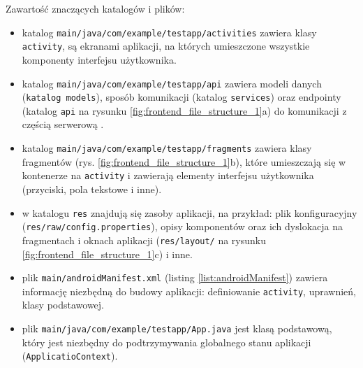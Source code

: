 Zawartość znaczących katalogów i plików:
\begin{itemize}
    \item katalog \texttt{main/java/com/example/testapp/activities} zawiera klasy \texttt{activity}, są ekranami aplikacji, na których umieszczone wszystkie komponenty interfejsu użytkownika.
    \item katalog \texttt{main/java/com/example/testapp/api} zawiera modeli danych (\texttt{katalog models}), sposób komunikacji (katalog \texttt{services}) oraz endpointy (katalog \texttt{api} na rysunku \ref{fig:frontend_file_structure_1}a) do komunikacji z częścią serwerową .
    \item katalog \texttt{main/java/com/example/testapp/fragments} zawiera klasy fragmentów (rys. \ref{fig:frontend_file_structure_1}b), które umieszczają się w kontenerze na \texttt{activity} i zawierają elementy interfejsu użytkownika (przyciski, pola tekstowe i inne).
    \item w katalogu \texttt{res} znajdują się zasoby aplikacji, na przykład: plik konfiguracyjny (\texttt{res/raw/config.properties}), opisy komponentów oraz ich dyslokacja na fragmentach i oknach aplikacji (\texttt{res/layout/} na rysunku \ref{fig:frontend_file_structure_1}c) i inne.
    \item plik \texttt{main/androidManifest.xml} (listing \ref{list:androidManifest}) zawiera informację niezbędną do budowy aplikacji: definiowanie \texttt{activity}, uprawnień, klasy podstawowej.
    \item plik \texttt{main/java/com/example/testapp/App.java} jest klasą podstawową, który jest niezbędny do podtrzymywania globalnego stanu aplikacji (\texttt{ApplicatioContext}).
\end{itemize}

